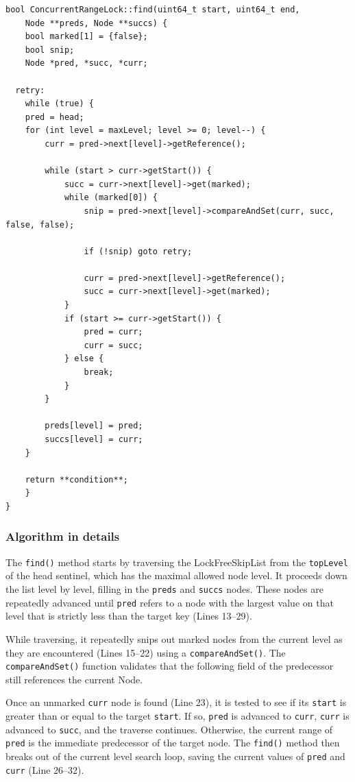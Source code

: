 \begin{lstlisting}[style=mystyle, caption=Find method implementation,label={}]
bool ConcurrentRangeLock::find(uint64_t start, uint64_t end,
    Node **preds, Node **succs) {
    bool marked[1] = {false};
    bool snip;
    Node *pred, *succ, *curr;

  retry:
    while (true) {
    pred = head;
    for (int level = maxLevel; level >= 0; level--) {
        curr = pred->next[level]->getReference();

        while (start > curr->getStart()) {
            succ = curr->next[level]->get(marked);
            while (marked[0]) {
                snip = pred->next[level]->compareAndSet(curr, succ, false, false);

                if (!snip) goto retry;

                curr = pred->next[level]->getReference();
                succ = curr->next[level]->get(marked);
            }
            if (start >= curr->getStart()) {
                pred = curr;
                curr = succ;
            } else {
                break;
            }
        }

        preds[level] = pred;
        succs[level] = curr;
    }
        
    return **condition**;
    }
}
\end{lstlisting}

\subsubsection{Algorithm in details}
The \texttt{find()} method starts by traversing the LockFreeSkipList from the \texttt{topLevel} of the head sentinel, which has the maximal allowed node level.
It proceeds down the list level by level, filling in the \texttt{preds} and \texttt{succs} nodes.
These nodes are repeatedly advanced until \texttt{pred} refers to a node with the largest value on that level that is strictly less than the target key (Lines 13--29).

While traversing, it repeatedly snips out marked nodes from the current level as they are encountered (Lines 15--22) using a \texttt{compareAndSet()}.
The \texttt{compareAndSet()} function validates that the following field of the predecessor still references the current Node.

Once an unmarked \texttt{curr} node is found (Line 23), it is tested to see if its \texttt{start} is greater than or equal to the target \texttt{start}.
If so, \texttt{pred} is advanced to \texttt{curr}, \texttt{curr} is advanced to \texttt{succ}, and the traverse continues.
Otherwise, the current range of \texttt{pred} is the immediate predecessor of the target node.
The \texttt{find()} method then breaks out of the current level search loop, saving the current values of \texttt{pred} and \texttt{curr} (Line 26--32).


